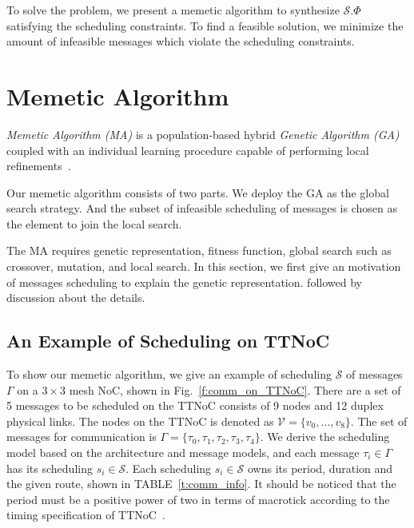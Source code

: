 \documentclass[10pt,journal]{IEEEtran}
\newcommand{\calV}{\mathcal{V}}
\newcommand{\calS}{\mathcal{S}}
\theoremstyle{remark}
\begin{document}
To solve the problem, we present a memetic algorithm to synthesize
$\calS.\Phi$ satisfying the scheduling constraints. 
To find a feasible solution,
 we minimize the amount of infeasible messages which violate the scheduling constraints.



\section{Memetic Algorithm \label{s:algorithm}}
\emph{Memetic Algorithm (MA)} is a population-based hybrid
\emph{Genetic Algorithm (GA)} coupled with an individual learning
procedure capable of performing local refinements~\cite{DBLP:journals/cim/OngLC10}.

Our memetic algorithm consists of two parts. We deploy the GA as the global search strategy.
And the subset of infeasible scheduling of messages is chosen as the element to join the local search.

The MA requires genetic representation,
 fitness function,
  global search such as crossover, mutation,
   and local search. 
In this section, we first give an motivation of messages scheduling to explain the genetic representation.
followed by discussion about the details.

\subsection{An Example of Scheduling on TTNoC}
To show our memetic algorithm,
 we give an example of scheduling $\calS$ of messages $\Gamma$ on a $3\times 3$ mesh NoC,
 shown in Fig.~\ref{f:comm_on_TTNoC}. 
There are a set of 5 messages to be scheduled on the TTNoC consists of 9 nodes and 12 duplex physical links.
The nodes on the TTNoC is denoted as $\calV=\{v_0,\dots,v_8\}$.
The set of messages for communication is $\Gamma=\{\tau_0,\tau_1,\tau_2,\tau_3,\tau_4\}$.
We derive the scheduling model based on the architecture and message models,
 and each message $\tau_i\in\Gamma$ has its scheduling $s_i\in\calS$.
Each scheduling $s_i\in\calS$ owns its period, duration and the given route,
shown in TABLE~\ref{t:comm_info}.
It should be noticed that the period must be a positive power of two in terms of macrotick according to the timing specification of TTNoC~\cite{DBLP:conf/date/HuangBRBK12}.
\end{document}
